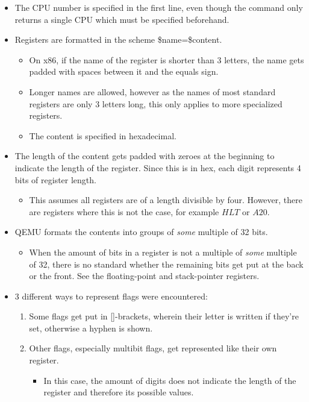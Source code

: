 \begin{itemize}
  \item The CPU number is specified in the first line, even though the command only returns a single CPU which must be specified beforehand.
  \item Registers are formatted in the scheme \$name=\$content.
  \begin{itemize}
    \item On x86, if the name of the register is shorter than 3 letters, the name gets padded with spaces between it and the equals sign.
    \item Longer names are allowed, however as the names of most standard registers are only 3 letters long, this only applies to more specialized registers.
    \item The content is specified in hexadecimal.
  \end{itemize}
  \item The length of the content gets padded with zeroes at the beginning to indicate the length of the register.
  Since this is in hex, each digit represents 4 bits of register length.
  \begin{itemize}
    \item This assumes all registers are of a length divisible by four.
    However, there are registers where this is not the case, for example $HLT$ or $A20$.
  \end{itemize}
  \item QEMU formats the contents into groups of \emph{some} multiple of 32 bits.
  \begin{itemize}
    \item When the amount of bits in a register is not a multiple of \emph{some} multiple of 32,
    there is no standard whether the remaining bits get put at the back or the front.
    See the floating-point and stack-pointer registers.
  \end{itemize}
  \item 3 different ways to represent flags were encountered:
  \begin{enumerate}
    \item Some flags get put in []-brackets, wherein their letter is written if they're set, otherwise a hyphen is shown.
    \item Other flags, especially multibit flags, get represented like their own register.
    \begin{itemize}
      \item In this case, the amount of digits does not indicate the length of the register and therefore its possible values.

\end{itemize}
\end{enumerate}
\end{itemize}
